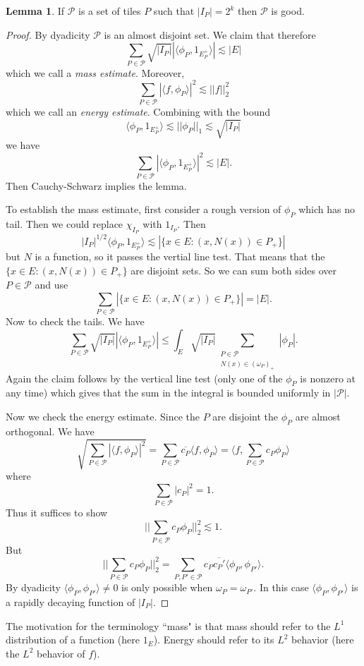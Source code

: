 \documentclass[12pt]{report}
\newcommand{\dfn}[1]{\emph{#1}\index{#1}}
\theoremstyle{definition}
\newtheorem{lemma}[theorem]{Lemma}
\begin{document}
\begin{lemma}
If $\mathcal P$ is a set of tiles $P$ such that $|I_P| = 2^k$ then $\mathcal P$ is good.
\end{lemma}
\begin{proof}
By dyadicity $\mathcal P$ is an almost disjoint set. We claim that therefore
$$\sum_{P \in \mathcal P} \sqrt{|I_P|}|\langle \phi_P, 1_{E_P^+}\rangle| \lesssim |E|$$
which we call a \dfn{mass estimate}.
Moreover,
$$\sum_{P \in \mathcal P} |\langle f, \phi_P\rangle|^2 \lesssim ||f||_2^2$$
which we call an \dfn{energy estimate}.
Combining with the bound
$$\langle \phi_P, 1_{E_P^+}\rangle \lesssim ||\phi_P||_1 \lesssim \sqrt{|I_P|}$$
we have
$$\sum_{P \in \mathcal P} |\langle \phi_P, 1_{E_P^+}\rangle|^2 \lesssim |E|.$$
Then Cauchy-Schwarz implies the lemma.

To establish the mass estimate, first consider a rough version of $\phi_P$ which has no tail. Then we could replace $\chi_{I_P}$ with $1_{I_P}$. Then
$$|I_P|^{1/2}\langle \phi_P, 1_{E_P^+}\rangle \lesssim |\{x \in E: (x, N(x)) \in P_+\}|$$
but $N$ is a function, so it passes the vertial line test. That means that the $\{x \in E: (x, N(x)) \in P_+\}$ are disjoint sets. So we can sum both sides over $P \in \mathcal P$ and use
$$\sum_{P \in \mathcal P}  |\{x \in E: (x, N(x)) \in P_+\}| = |E|.$$
Now to check the tails. We have
$$\sum_{P \in \mathcal P} \sqrt{|I_P|}|\langle \phi_P, 1_{E_P^+}\rangle| \leq \int_E \sqrt{|I_P|} \sum_{\substack{P \in \mathcal P\\N(x)\in (\omega_P)_+}} |\phi_P|.$$
Again the claim follows by the vertical line test (only one of the $\phi_P$ is nonzero at any time) which gives that the sum in the integral is bounded uniformly in $|\mathcal P|$.

Now we check the energy estimate. Since the $P$ are disjoint the $\phi_P$ are almost orthogonal. We have
$$\sqrt{\sum_{P \in \mathcal P}|\langle f, \phi_P\rangle|^2} = \sum_{P \in \mathcal P} \overline{c_P}\langle f, \phi_P\rangle = \langle f, \sum_{P \in \mathcal P} c_P\phi_P\rangle$$
where
$$\sum_{P \in \mathcal P} |c_P|^2 = 1.$$
Thus it suffices to show
$$||\sum_{P \in \mathcal P} c_P\phi_P||_2^2 \lesssim 1.$$
But
$$||\sum_{P \in \mathcal P} c_P\phi_P||_2^2 = \sum_{P,P' \in \mathcal P} c_P\overline{c_P'}\langle \phi_P, \phi_{P'}\rangle.$$
By dyadicity $\langle \phi_P, \phi_{P'}\rangle \neq 0$ is only possible when $\omega_P = \omega_{P'}$. In this case $\langle \phi_P, \phi_{P'}\rangle$ is a rapidly decaying function of $|I_P|$.
\end{proof}
The motivation for the terminology ``mass" is that mass should refer to the $L^1$ distribution of a function (here $1_E$).
Energy should refer to its $L^2$ behavior (here the $L^2$ behavior of $f$).
\end{document}
